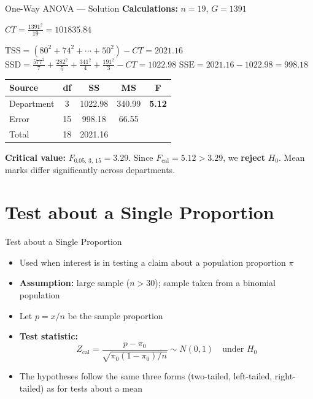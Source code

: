 \documentclass[12pt, aspectratio=169]{beamer}
\begin{document}
    \begin{frame}{One-Way ANOVA --- Solution}
        \textbf{Calculations:} $n = 19$, $G = 1391$

        \(
            CT = \frac{1391^2}{19} = 101835.84
        \)

        \(
            \text{TSS} = (80^2 + 74^2 + \cdots + 50^2) - CT = 2021.16
        \)
        \(
            \text{SSD} = \frac{577^2}{7}+\frac{282^2}{5}+\frac{341^2}{4}+\frac{191^2}{3} - CT
            = 1022.98
        \)
        \(
            \text{SSE} = 2021.16 - 1022.98 = 998.18
        \)

        \begin{center}
            \begin{tabular}{lcccc}
                \toprule
                \textbf{Source} & \textbf{df} & \textbf{SS} & \textbf{MS} & \textbf{F} \\
                \midrule
                Department & 3 & 1022.98 & 340.99 & \textbf{5.12} \\
                Error & 15 & 998.18 & 66.55 & \\
                Total & 18 & 2021.16 & & \\
                \bottomrule
            \end{tabular}
        \end{center}

        \textbf{Critical value:} $F_{0.05,\,3,\,15} = 3.29$. Since $F_{\text{cal}} = 5.12 > 3.29$,
        we \textbf{reject} $H_0$. Mean marks differ significantly across departments.
    \end{frame}


    \section{Test about a Single Proportion}


    \begin{frame}{Test about a Single Proportion}
        \begin{itemize}
            \item Used when interest is in testing a claim about a population proportion $\pi$
            \item \textbf{Assumption:} large sample ($n > 30$); sample taken from
                a binomial population
            \item Let $p = x/n$ be the sample proportion
            \item \textbf{Test statistic:}
            \[
                Z_{\text{cal}} = \frac{p - \pi_0}{\sqrt{\pi_0(1-\pi_0)/n}}
                \sim N(0,1) \quad \text{under } H_0
            \]
            \item The hypotheses follow the same three forms (two-tailed, left-tailed,
                right-tailed) as for tests about a mean
        \end{itemize}
    \end{frame}
\end{document}
